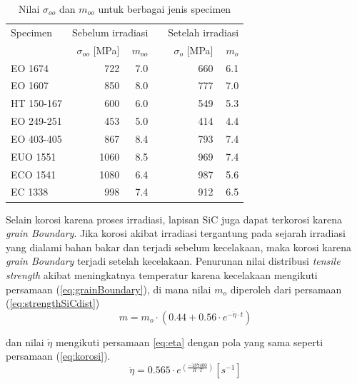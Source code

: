 \documentclass[a4paper,11pt]{report}
\newcommand{\ra}[1]{\renewcommand{\arraystretch}{#1}}
\begin{document}
\begin{table}
  \caption[Nilai $\sigma_{oo}$ dan $m_{oo}$ untuk berbagai jenis specimen]{Nilai $\sigma_{oo}$ dan $m_{oo}$ untuk berbagai jenis specimen\cite{report1}}
  \label{tab:oo}

  \begin{center}
  \ra{1.3}
    \begin{tabular}{@{}lrrcrr@{}}\toprule
    Specimen & \multicolumn{2}{c}{Sebelum irradiasi} & \phantom{abc} & \multicolumn{2}{c}{Setelah irradiasi} \\ \cmidrule{2-3} \cmidrule{5-6} 
       & $\sigma_{oo}$ [MPa] & $m_{oo}$ && $\sigma_{o}$ [MPa] & $m_{o}$ \\ \midrule%
       EO 1674 & 722 & 7.0 && 660 & 6.1\\
       EO 1607 & 850 & 8.0 && 777 & 7.0\\
       HT 150-167 & 600 & 6.0 && 549 & 5.3\\
       EO 249-251 & 453 & 5.0 && 414 & 4.4\\
       EO 403-405 & 867 & 8.4 && 793 & 7.4\\
       EUO 1551 & 1060 & 8.5 && 969 & 7.4\\
       ECO 1541 & 1080 & 6.4 && 987 & 5.6\\
       EC 1338 & 998 & 7.4 && 912 & 6.5\\ %
       \bottomrule
    \end{tabular}
  \end{center}
\end{table}


Selain korosi karena proses irradiasi, lapisan SiC juga dapat terkorosi karena \textit{grain Boundary}. Jika korosi akibat irradiasi tergantung pada sejarah irradiasi yang dialami bahan bakar dan terjadi sebelum kecelakaan, maka korosi karena \textit{grain Boundary} terjadi setelah kecelakaan. Penurunan nilai distribusi \textit{tensile strength} akibat meningkatnya temperatur karena kecelakaan mengikuti persamaan (\ref{eq:grainBoundary}), di mana nilai $m_o$ diperoleh dari persamaan (\ref{eq:strengthSiCdist})
\begin{equation}
  m=m_o \cdot \left( 0.44 + 0.56 \cdot e^{-\dot{\eta} \cdot t}\right)
  \label{eq:grainBoundary}
\end{equation}

dan nilai $\dot{\eta}$ mengikuti persamaan {\ref{eq:eta}} dengan pola yang sama seperti persamaan (\ref{eq:korosi}).
\begin{equation}
  \dot{\eta}=0.565 \cdot e^{\left(\frac{-187400}{R \cdot T}\right)} [s^{-1}]
  \label{eq:eta}
\end{equation}
\end{document}
